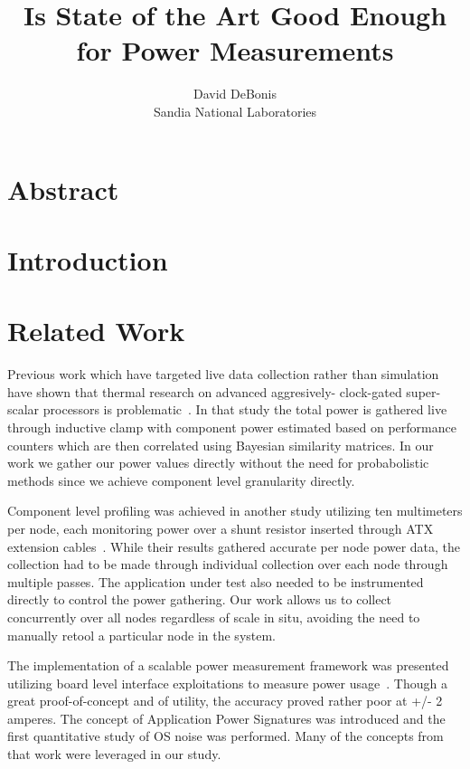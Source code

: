 \documentclass{article}
\begin{document}
\title{Is State of the Art Good Enough\\for Power Measurements}
\author{David DeBonis\\Sandia National Laboratories}
\renewcommand{\today}{July 22, 2013}
\maketitle
\section{Abstract}
\section{Introduction}
\section{Related Work}
Previous work which have targeted live data collection rather than
simulation have shown that thermal research on advanced aggresively-
clock-gated super-scalar processors is problematic~\cite{isci2003}.  In
that study the total power is gathered live through inductive clamp
with component power estimated based on performance counters which
are then correlated using Bayesian similarity matrices.  In our
work we gather our power values directly without the need for
probabolistic methods since we achieve component level granularity
directly.

Component level profiling was achieved in another study utilizing
ten multimeters per node, each monitoring power over a shunt resistor
inserted through ATX extension cables~\cite{feng2005}.  While their results
gathered accurate per node power data, the collection had to be made
through individual collection over each node through multiple passes.
The application under test also needed to be instrumented directly to
control the power gathering.  Our work allows us to collect concurrently
over all nodes regardless of scale in situ, avoiding the need to
manually retool a particular node in the system.

The implementation of a scalable power measurement framework was
presented utilizing board level interface exploitations to measure
power usage~\cite{laros2009}.  Though a great proof-of-concept and of
utility, the accuracy proved rather poor at +/- 2 amperes.  The
concept of Application Power Signatures was introduced and the
first quantitative study of OS noise was performed.  Many of the
concepts from that work were leveraged in our study.
\end{document}
